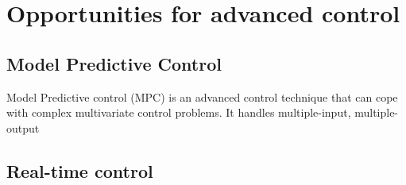 \section{Opportunities for advanced control}

\subsection{Model Predictive Control}
Model Predictive control (MPC) is an advanced control technique that can cope with complex multivariate control problems. It handles multiple-input, multiple-output
\subsection{Real-time control}